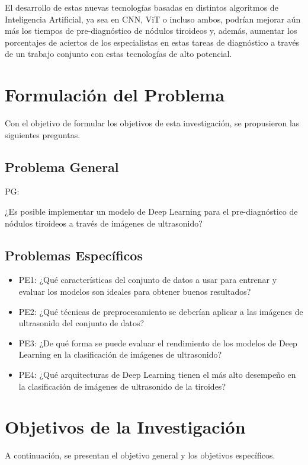 El desarrollo de estas nuevas tecnologías basadas en distintos algoritmos de Inteligencia Artificial, ya sea en CNN, ViT o incluso ambos, podrían mejorar aún más los tiempos de pre-diagnóstico de nódulos tiroideos y, además, aumentar los porcentajes de aciertos de los especialistas en estas tareas de diagnóstico a través de un trabajo conjunto con estas tecnologías de alto potencial.



\section{Formulación del Problema}
Con el objetivo de formular los objetivos de esta investigación, se propusieron las siguientes preguntas.
\subsection{Problema General}
PG: \newcommand{\ProblemaGeneral}{
¿Es posible implementar un modelo de Deep Learning para el pre-diagnóstico de nódulos tiroideos a través de imágenes de ultrasonido?
}
\ProblemaGeneral
\subsection{Problemas Específicos}
\newcommand{\Pbone}{
¿Qué características del conjunto de datos a usar para entrenar y evaluar los modelos son ideales para obtener buenos resultados?
}
\newcommand{\Pbtwo}{
¿Qué técnicas de preprocesamiento se deberían aplicar a las imágenes de ultrasonido del conjunto de datos?
}
\newcommand{\Pbthree}{
¿De qué forma se puede evaluar el rendimiento de los modelos de Deep Learning en la clasificación de imágenes de ultrasonido?
}
\newcommand{\Pbfour}{
¿Qué arquitecturas de Deep Learning tienen el más alto desempeño en la clasificación de imágenes de ultrasonido de la tiroides?
}

\begin{itemize}
	\item PE1: {\Pbone}
	\item PE2: {\Pbtwo}
	\item PE3: {\Pbthree}
	\item PE4: {\Pbfour}
\end{itemize}

\section{Objetivos de la Investigación}
A continuación, se presentan el objetivo general y los objetivos específicos.
